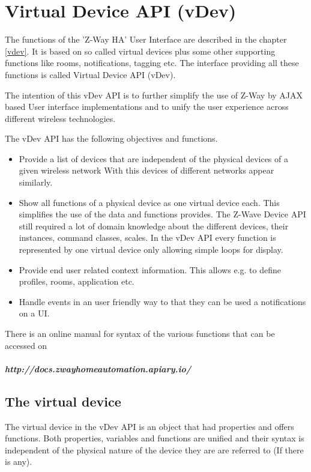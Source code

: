 \chapter{Virtual Device API (vDev)}
\label{vdevapi}


The functions of the 'Z-Way HA' User Interface are described in the chapter \ref{vdev}. 
It  is based on so called virtual devices plus some other supporting functions
like rooms, notifications, tagging etc. The interface providing all these functions is 
called Virtual Device API (vDev).

The intention of this vDev API  is to further simplify the use of Z-Way by AJAX based 
User interface implementations and to unify the user experience across
different wireless technologies.
  
The vDev API has the following objectives and functions.

\begin{itemize}
\item Provide a list of devices that are independent of the physical devices of a 
given wireless network With this devices of different networks appear similarly.
\item Show all functions of a physical device as one virtual device each. This simplifies
the use of the data and functions provides. The Z-Wave Device API still required 
a lot of domain knowledge about the different devices, their instances, command classes, 
scales. In the vDev API every function is represented by one virtual device only 
allowing simple loops for display.
\item Provide end user related context information. This allows e.g. to define profiles, 
rooms, application etc.
\item Handle events in an user friendly way to that they can be used a notifications on a UI.
\end{itemize}

There is an online manual for syntax of the various functions that can be accessed on 

\paragraph{http://docs.zwayhomeautomation.apiary.io/}
 

\section{The virtual device}

The virtual device in the vDev API is an object that had properties and offers functions. 
Both properties, variables and functions are unified and their syntax is independent of 
the physical nature of the device they are are referred to (If there is any).

